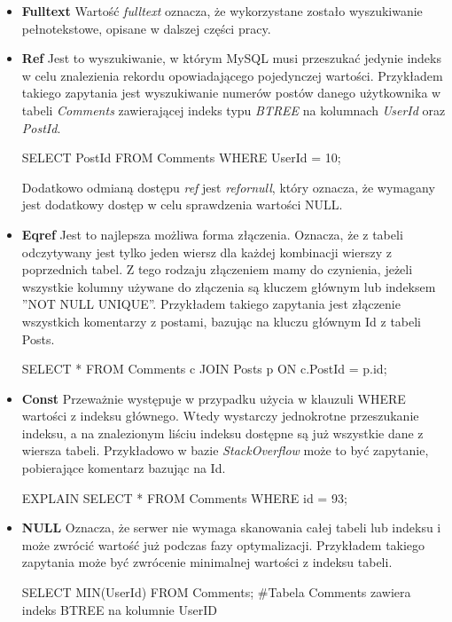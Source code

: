\begin{itemize}
\item \textbf{Fulltext} \newline 
Wartość \textit{fulltext} oznacza, że wykorzystane zostało wyszukiwanie pełnotekstowe, opisane w dalszej części pracy.
\item \textbf{Ref} \newline
Jest to wyszukiwanie, w którym MySQL musi przeszukać jedynie indeks w celu znalezienia rekordu opowiadającego pojedynczej wartości.
Przykładem takiego zapytania jest wyszukiwanie numerów postów danego użytkownika w tabeli \textit{Comments} zawierającej indeks typu \textit{BTREE} na kolumnach \textit{UserId} oraz \textit{PostId}.

\begin{spverbatim}
	SELECT PostId FROM Comments WHERE UserId = 10;
\end{spverbatim}
Dodatkowo odmianą dostępu \textit{ref} jest \textit{ref\textunderscore or\textunderscore null}, który oznacza, że wymagany jest dodatkowy dostęp w celu sprawdzenia wartości NULL.

\item \textbf{Eq\textunderscore ref} \newline 
Jest to najlepsza możliwa forma złączenia. Oznacza, że z tabeli odczytywany jest tylko jeden wiersz dla każdej kombinacji wierszy z poprzednich tabel. Z tego rodzaju złączeniem mamy do czynienia, jeżeli wszystkie kolumny używane do złączenia są kluczem głównym lub indeksem ''NOT NULL UNIQUE''. Przykładem takiego zapytania jest złączenie wszystkich komentarzy z postami, bazując na kluczu głównym Id z tabeli Posts. 
\begin{spverbatim}
	SELECT * FROM Comments c JOIN Posts p ON c.PostId = p.id;
\end{spverbatim}

\item \textbf{Const} \newline 
Przeważnie występuje w przypadku użycia w klauzuli WHERE wartości z indeksu głównego. Wtedy wystarczy jednokrotne przeszukanie indeksu, a na znalezionym liściu indeksu dostępne są już wszystkie dane z wiersza tabeli. Przykładowo w bazie \textit{StackOverflow} może to być zapytanie, pobierające komentarz bazując na Id.
\begin{spverbatim}
	EXPLAIN SELECT * FROM Comments WHERE id = 93;
\end{spverbatim}


\item {\textbf{NULL}}\newline
Oznacza, że serwer nie wymaga skanowania całej tabeli lub indeksu i może zwrócić wartość już podczas fazy optymalizacji. Przykładem takiego zapytania może być zwrócenie minimalnej wartości z indeksu tabeli.

\begin{spverbatim}
	SELECT MIN(UserId) FROM Comments;
	#Tabela Comments zawiera indeks BTREE na kolumnie UserID
\end{spverbatim}

\end{itemize}

